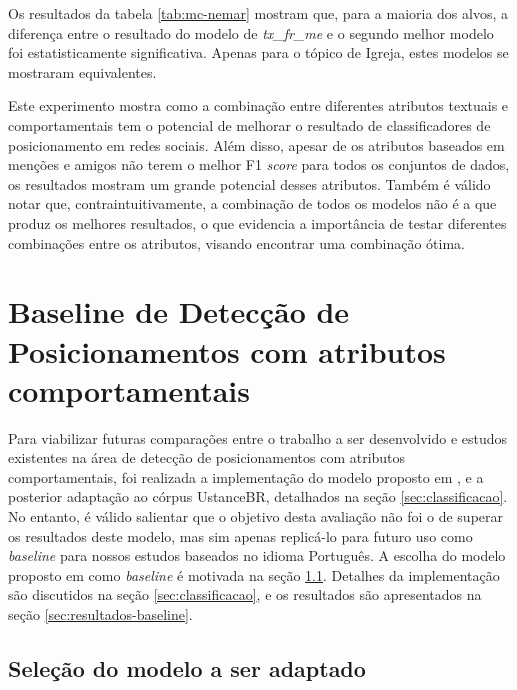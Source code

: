 \documentclass[
	12pt, oneside, a4paper, english, brazil
]{abntex2ppgsi}
\begin{document}
Os resultados da tabela \ref{tab:mc-nemar} mostram que, para a maioria dos alvos, a diferença entre o resultado do modelo de {\em tx\_fr\_me} e o segundo melhor modelo foi estatisticamente significativa. Apenas para o tópico de Igreja, estes modelos se mostraram equivalentes.

Este experimento mostra como a combinação entre diferentes atributos textuais e comportamentais tem o potencial de melhorar o resultado de classificadores de posicionamento em redes sociais. Além disso, apesar de os atributos baseados em menções e amigos não terem o melhor F1 {\em score} para todos os conjuntos de dados, os resultados mostram um grande potencial desses atributos. Também é válido notar que, contraintuitivamente, a combinação de todos os modelos não é a que produz os melhores resultados, o que evidencia a importância de testar diferentes combinações entre os atributos, visando encontrar uma combinação ótima.

\section{Baseline de Detecção de Posicionamentos com atributos comportamentais}
\label{sec:experimento-baseline}

Para viabilizar futuras comparações entre o trabalho a ser desenvolvido e estudos existentes na área de detecção de posicionamentos com atributos comportamentais, foi realizada a implementação do modelo proposto em , e a posterior adaptação ao córpus UstanceBR, detalhados na seção \ref{sec:classificacao}.
No entanto, é válido salientar que o objetivo desta avaliação não foi o de superar os resultados deste modelo, mas sim apenas replicá-lo para futuro uso como {\em baseline} para nossos estudos baseados no idioma Português. A escolha do modelo proposto em  como {\em baseline} é motivada na seção \ref{sec:baseline}. Detalhes da implementação são  discutidos na seção \ref{sec:classificacao}, e os resultados são apresentados na seção \ref{sec:resultados-baseline}.

\subsection{Seleção do modelo a ser adaptado}
\label{sec:baseline}
\end{document}
